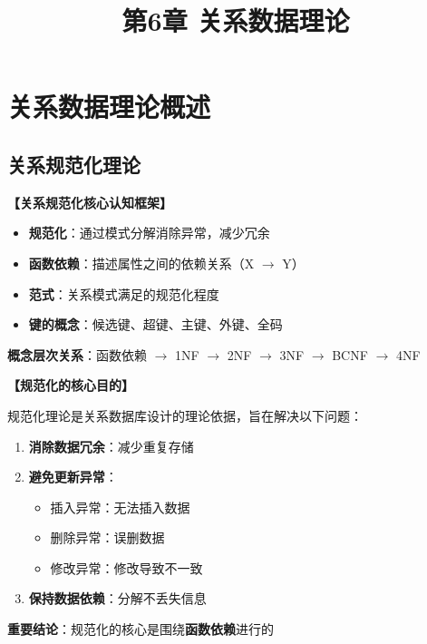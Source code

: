\documentclass[12pt, a4paper]{article}
\title{\textbf{第6章 关系数据理论}}
\date{}
\newenvironment{bluebox}[1]{%
  \begin{trivlist}
  \item[\hskip\labelsep \textbf{#1}]
  \setlength{\parskip}{0.5ex}
  \setlength{\itemsep}{0.5ex}
}{%
  \end{trivlist}
  }
\begin{document}
\maketitle
\thispagestyle{empty}
\newpage

\section{关系数据理论概述}

\subsection{关系规范化理论}

\begin{bluebox}{核心概念框架}
	\textbf{【关系规范化核心认知框架】}

	\begin{itemize}[leftmargin=*, nosep]
		\item \textbf{规范化}：通过模式分解消除异常，减少冗余
		\item \textbf{函数依赖}：描述属性之间的依赖关系（X $\to$ Y）
		\item \textbf{范式}：关系模式满足的规范化程度
		\item \textbf{键的概念}：候选键、超键、主键、外键、全码
	\end{itemize}

	\textbf{概念层次关系}：函数依赖 $\to$ 1NF $\to$ 2NF $\to$ 3NF $\to$ BCNF $\to$ 4NF
\end{bluebox}

\begin{bluebox}{规范化目的}
	\textbf{【规范化的核心目的】}

	规范化理论是关系数据库设计的理论依据，旨在解决以下问题：

	\begin{enumerate}[leftmargin=*, label=\textbf{\arabic*.}]
		\item \textbf{消除数据冗余}：减少重复存储
		\item \textbf{避免更新异常}：
		      \begin{itemize}[nosep]
			      \item 插入异常：无法插入数据
			      \item 删除异常：误删数据
			      \item 修改异常：修改导致不一致
		      \end{itemize}
		\item \textbf{保持数据依赖}：分解不丢失信息
	\end{enumerate}

	\textbf{重要结论}：规范化的核心是围绕\textbf{函数依赖}进行的
\end{bluebox}
\end{document}
